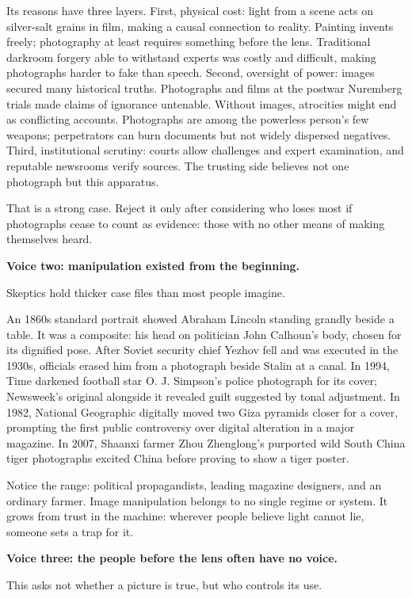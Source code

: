 Its reasons have three layers. First, physical cost: light from a scene acts on silver-salt grains in film, making a causal connection to reality. Painting invents freely; photography at least requires something before the lens. Traditional darkroom forgery able to withstand experts was costly and difficult, making photographs harder to fake than speech. Second, oversight of power: images secured many historical truths. Photographs and films at the postwar Nuremberg trials made claims of ignorance untenable. Without images, atrocities might end as conflicting accounts. Photographs are among the powerless person's few weapons; perpetrators can burn documents but not widely dispersed negatives. Third, institutional scrutiny: courts allow challenges and expert examination, and reputable newsrooms verify sources. The trusting side believes not one photograph but this apparatus.

That is a strong case. Reject it only after considering who loses most if photographs cease to count as evidence: those with no other means of making themselves heard.

\textbf{Voice two: manipulation existed from the beginning.}

Skeptics hold thicker case files than most people imagine.

An 1860s standard portrait showed Abraham Lincoln standing grandly beside a table. It was a composite: his head on politician John Calhoun's body, chosen for its dignified pose. After Soviet security chief Yezhov fell and was executed in the 1930s, officials erased him from a photograph beside Stalin at a canal. In 1994, Time darkened football star O. J. Simpson's police photograph for its cover; Newsweek's original alongside it revealed guilt suggested by tonal adjustment. In 1982, National Geographic digitally moved two Giza pyramids closer for a cover, prompting the first public controversy over digital alteration in a major magazine. In 2007, Shaanxi farmer Zhou Zhenglong's purported wild South China tiger photographs excited China before proving to show a tiger poster.

Notice the range: political propagandists, leading magazine designers, and an ordinary farmer. Image manipulation belongs to no single regime or system. It grows from trust in the machine: wherever people believe light cannot lie, someone sets a trap for it.

\textbf{Voice three: the people before the lens often have no voice.}

This asks not whether a picture is true, but who controls its use.

